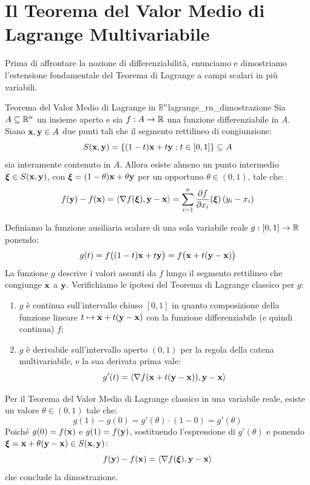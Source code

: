 \section{Il Teorema del Valor Medio di Lagrange Multivariabile}

Prima di affrontare la nozione di differenziabilità, enunciamo e dimostriamo l'estensione fondamentale del Teorema di Lagrange a campi scalari in più variabili.

\begin{teorema}{Teorema del Valor Medio di Lagrange in $\mathbb{R}^n$}{lagrange_rn_dimostrazione}
Sia $A \subseteq \mathbb{R}^n$ un insieme aperto e sia $f: A \to \mathbb{R}$ una funzione differenziabile in $A$. Siano $\mathbf{x}, \mathbf{y} \in A$ due punti tali che il segmento rettilineo di congiunzione:
\[
S(\mathbf{x}, \mathbf{y}) = \{(1-t)\mathbf{x} + t\mathbf{y} : t \in [0, 1]\} \subseteq A
\]
sia interamente contenuto in $A$.
Allora esiste almeno un punto intermedio $\boldsymbol{\xi} \in S(\mathbf{x}, \mathbf{y})$, con $\boldsymbol{\xi} = (1-\theta)\mathbf{x} + \theta\mathbf{y}$ per un opportuno $\theta \in (0, 1)$, tale che:
\[
f(\mathbf{y}) - f(\mathbf{x}) = \langle\nabla f(\boldsymbol{\xi}), \mathbf{y} - \mathbf{x}\rangle = \sum_{i=1}^n \frac{\partial f}{\partial x_i}(\boldsymbol{\xi}) \, (y_i - x_i)
\]
\end{teorema}

\begin{dimostrazione}
Definiamo la funzione ausiliaria scalare di una sola variabile reale $g: [0, 1] \to \mathbb{R}$ ponendo:
\[
g(t) = f\big( (1-t)\mathbf{x} + t\mathbf{y} \big) = f\big( \mathbf{x} + t(\mathbf{y} - \mathbf{x}) \big)
\]
La funzione $g$ descrive i valori assunti da $f$ lungo il segmento rettilineo che congiunge $\mathbf{x}$ a $\mathbf{y}$.
Verifichiamo le ipotesi del Teorema di Lagrange classico per $g$:
\begin{enumerate}
    \item $g$ è continua sull'intervallo chiuso $[0, 1]$ in quanto composizione della funzione lineare $t \mapsto \mathbf{x} + t(\mathbf{y} - \mathbf{x})$ con la funzione differenziabile (e quindi continua) $f$;
    \item $g$ è derivabile sull'intervallo aperto $(0, 1)$ per la regola della catena multivariabile, e la sua derivata prima vale:
    \[
    g'(t) = \langle\nabla f(\mathbf{x} + t(\mathbf{y} - \mathbf{x})), \mathbf{y} - \mathbf{x}\rangle
    \]
\end{enumerate}
Per il Teorema del Valor Medio di Lagrange classico in una variabile reale, esiste un valore $\theta \in (0, 1)$ tale che:
\[
g(1) - g(0) = g'(\theta) \cdot (1 - 0) = g'(\theta)
\]
Poiché $g(0) = f(\mathbf{x})$ e $g(1) = f(\mathbf{y})$, sostituendo l'espressione di $g'(\theta)$ e ponendo $\boldsymbol{\xi} = \mathbf{x} + \theta(\mathbf{y} - \mathbf{x}) \in S(\mathbf{x}, \mathbf{y})$:
\[
f(\mathbf{y}) - f(\mathbf{x}) = \langle\nabla f(\boldsymbol{\xi}), \mathbf{y} - \mathbf{x}\rangle
\]
che conclude la dimostrazione.
\end{dimostrazione}

